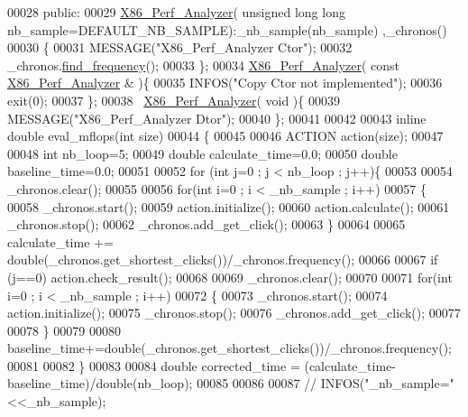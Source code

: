 \begin{DoxyCode}
00028 \textcolor{keyword}{public}:
00029   \hyperlink{class_x86___perf___analyzer}{X86\_Perf\_Analyzer}( \textcolor{keywordtype}{unsigned} \textcolor{keywordtype}{long} \textcolor{keywordtype}{long} nb\_sample=DEFAULT\_NB\_SAMPLE):\_nb\_sample(nb\_sample)
      ,\_chronos()
00030   \{
00031     MESSAGE(\textcolor{stringliteral}{"X86\_Perf\_Analyzer Ctor"});
00032     \_chronos.\hyperlink{class_x86___timer_a1beddd8cb10ed89d3dd06d3b233b63e1}{find\_frequency}();
00033   \};
00034   \hyperlink{class_x86___perf___analyzer}{X86\_Perf\_Analyzer}( \textcolor{keyword}{const} \hyperlink{class_x86___perf___analyzer}{X86\_Perf\_Analyzer} & )\{
00035     INFOS(\textcolor{stringliteral}{"Copy Ctor not implemented"});
00036     exit(0);
00037   \};
00038   ~\hyperlink{class_x86___perf___analyzer}{X86\_Perf\_Analyzer}( \textcolor{keywordtype}{void} )\{
00039     MESSAGE(\textcolor{stringliteral}{"X86\_Perf\_Analyzer Dtor"});
00040   \};
00041 
00042 
00043   \textcolor{keyword}{inline} \textcolor{keywordtype}{double} eval\_mflops(\textcolor{keywordtype}{int} size)
00044   \{
00045 
00046     ACTION action(size);
00047 
00048     \textcolor{keywordtype}{int} nb\_loop=5;
00049     \textcolor{keywordtype}{double} calculate\_time=0.0;
00050     \textcolor{keywordtype}{double} baseline\_time=0.0;
00051 
00052     \textcolor{keywordflow}{for} (\textcolor{keywordtype}{int} j=0 ; j < nb\_loop ; j++)\{
00053 
00054       \_chronos.clear();
00055 
00056       \textcolor{keywordflow}{for}(\textcolor{keywordtype}{int} i=0 ; i < \_nb\_sample  ; i++)
00057       \{
00058         \_chronos.start();
00059         action.initialize();
00060         action.calculate();
00061         \_chronos.stop();
00062         \_chronos.add\_get\_click();
00063       \}
00064 
00065       calculate\_time += double(\_chronos.get\_shortest\_clicks())/\_chronos.frequency();
00066 
00067       \textcolor{keywordflow}{if} (j==0) action.check\_result();
00068 
00069       \_chronos.clear();
00070 
00071       \textcolor{keywordflow}{for}(\textcolor{keywordtype}{int} i=0 ; i < \_nb\_sample  ; i++)
00072       \{
00073         \_chronos.start();
00074         action.initialize();
00075         \_chronos.stop();
00076         \_chronos.add\_get\_click();
00077 
00078       \}
00079 
00080       baseline\_time+=double(\_chronos.get\_shortest\_clicks())/\_chronos.frequency();
00081 
00082     \}
00083 
00084     \textcolor{keywordtype}{double} corrected\_time = (calculate\_time-baseline\_time)/\textcolor{keywordtype}{double}(nb\_loop);
00085 
00086 
00087 \textcolor{comment}{//     INFOS("\_nb\_sample="<<\_nb\_sample);}

\end{DoxyCode}
